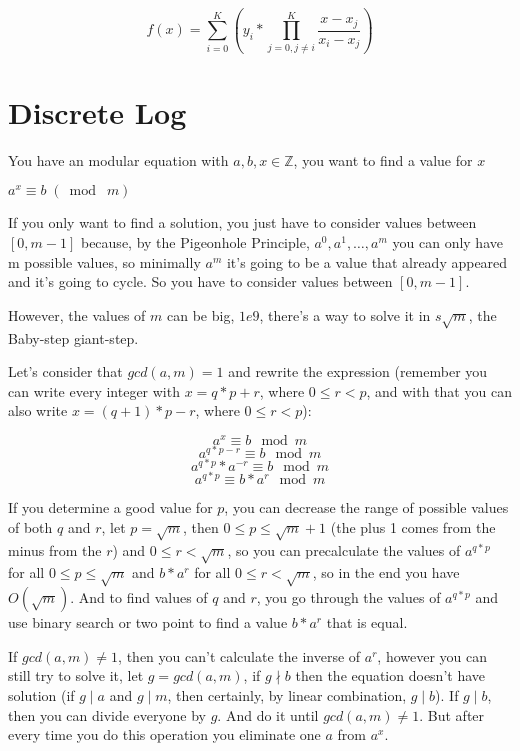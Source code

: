        \[
            f(x) = \sum_{i=0}^{K} \left(y_i * \prod_{j=0,j \neq i}^K \frac{x - x_j}{x_i - x_j}\right)
        \]
        
    \section{Discrete Log}

        \tab You have an modular equation with $a,b,x \in \mathbb{Z}$, you want to find a value for $x$
        
        $a^x \equiv b \;(\bmod\; m)$

        If you only want to find a solution, you just have to consider values between $[0,m-1]$ because, by the Pigeonhole Principle, $a^0,a^1,\dots,a^m$ you can only have m possible values, so minimally $a^m$ it's going to be a value that already appeared and it's going to cycle. So you have to consider values between $[0,m-1]$.

        However, the values of $m$ can be big, $1e9$, there's a way to solve it in $s\sqrt{m}$, the Baby-step giant-step.

        Let's consider that $gcd(a,m) = 1$ and rewrite the expression (remember you can write every integer with $x = q*p + r$, where $0 \leq r < p$, and with that you can also write $x = (q+1)*p -r$, where $0 \leq r < p$):

        $$
        a^x \equiv b \mod{m} 
        $$
        $$
        a^{q*p-r} \equiv b \mod{m}
        $$
        $$
        a^{q*p}*a^{-r} \equiv b \mod{m}
        $$
        $$
        a^{q*p} \equiv b*a^r \mod{m}
        $$

        If you determine a good value for $p$, you can decrease the range of possible values of both $q$ and $r$, let $p = \sqrt{m}$, then $0 \leq p \leq \sqrt{m}+1$ (the plus 1 comes from the minus from the $r$) and $0 \leq r < \sqrt{m}$, so you can precalculate the values of $a^{q*p}$ for all $0 \leq p \leq \sqrt{m}$ and $b*a^{r}$ for all $0 \leq r < \sqrt{m}$, so in the end you have $O(\sqrt{m})$. And to find values of $q$ and $r$, you go through the values of $a^{q*p}$ and use binary search or two point to find a value $b*a^r$ that is equal.

        If $gcd(a,m) \neq 1$, then you can't calculate the inverse of $a^r$, however you can still try to solve it, let $g = gcd(a,m)$, if $g \nmid b$ then the equation doesn't have solution (if $g \mid a$ and $g \mid m$, then certainly, by linear combination, $g \mid b$). If $g \mid b$, then you can divide everyone by $g$. And do it until $gcd(a,m) \neq 1$. But after every time you do this operation you eliminate one $a$ from $a^x$.

